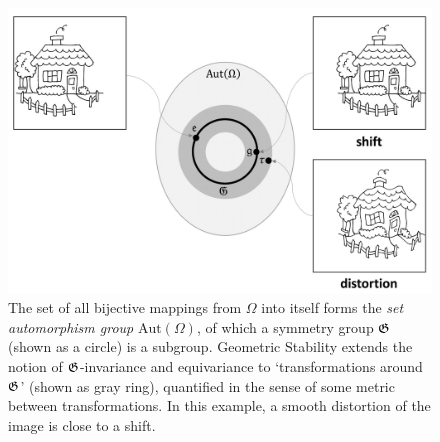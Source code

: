 
\begin{figure}[!htbp]
    \centering
    \includegraphics[width=1\textwidth]{figures/g_autg.png}
    \caption{The set of all bijective mappings from $\Omega$ into itself forms the \emph{set automorphism group}  $\mathrm{Aut}(\Omega)$, of which a symmetry group ${\mathfrak{G}}$ (shown as a circle) is a subgroup. Geometric Stability extends the notion of ${\mathfrak{G}}$-invariance and equivariance to `transformations around ${\mathfrak{G}}$' (shown as gray ring), quantified in the sense of some metric between transformations.
    In this example, a smooth distortion of the image is close to a shift. 
    }
    \label{fig:groupdeformation}
\end{figure}


